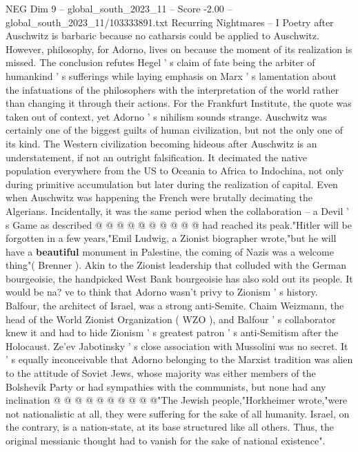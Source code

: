 \begin{textsample}{NEG Dim 9 – global\_south\_2023\_11 – Score -2.00 – global\_south\_2023\_11/103333891.txt}  \label{ex:f9_neg_428}
Recurring Nightmares -- I Poetry after Auschwitz is barbaric because no catharsis could be applied to Auschwitz.
However, philosophy, for Adorno, lives on because the moment of its realization is missed.
The conclusion refutes Hegel ' s claim of fate being the arbiter of humankind ' s sufferings while laying emphasis on Marx ' s lamentation about the infatuations of the philosophers with the interpretation of the world rather than changing it through their actions.
For the Frankfurt Institute, the quote was taken out of context, yet Adorno ' s nihilism sounds strange.
Auschwitz was certainly one of the biggest guilts of human civilization, but not the only one of its kind.
The Western civilization becoming hideous after Auschwitz is an understatement, if not an outright falsification.
It decimated the native population everywhere from the US to Oceania to Africa to Indochina, not only during primitive accumulation but later during the realization of capital.
Even when Auschwitz was happening the French were brutally decimating the Algerians.
Incidentally, it was the same period when the collaboration -- a Devil ' s Game as described @ @ @ @ @ @ @ @ @ @ had reached its peak."Hitler will be forgotten in a few years,"Emil Ludwig, a Zionist biographer wrote,"but he will have a \textbf{beautiful} monument in Palestine, the coming of Nazis was a welcome thing"( Brenner ).
Akin to the Zionist leadership that colluded with the German bourgeoisie, the handpicked West Bank bourgeoisie has also sold out its people.
It would be na? ve to think that Adorno wasn't privy to Zionism ' s history.
Balfour, the architect of Israel, was a strong anti-Semite.
Chaim Weizmann, the head of the World Zionist Organization ( WZO ), and Balfour ' s collaborator knew it and had to hide Zionism ' s greatest patron ' s anti-Semitism after the Holocaust.
Ze'ev Jabotinsky ' s close association with Mussolini was no secret.
It ' s equally inconceivable that Adorno belonging to the Marxist tradition was alien to the attitude of Soviet Jews, whose majority was either members of the Bolshevik Party or had sympathies with the communists, but none had any inclination @ @ @ @ @ @ @ @ @ @"The Jewish people,"Horkheimer wrote,"were not nationalistic at all, they were suffering for the sake of all humanity.
Israel, on the contrary, is a nation-state, at its base structured like all others.
Thus, the original messianic thought had to vanish for the sake of national existence".

\end{textsample}

